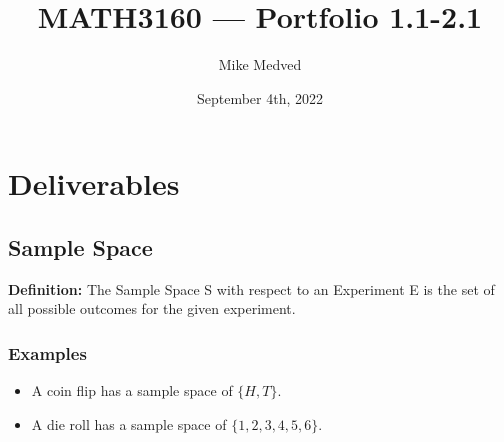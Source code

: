 \documentclass{article}
\title{MATH3160 — Portfolio 1.1-2.1}
\author{Mike Medved}
\date{September 4th, 2022}
\begin{document}
\maketitle

\section{Deliverables}

\subsection{Sample Space}

\textbf{Definition:} The Sample Space S with respect to an Experiment E is the set of all possible outcomes for the given experiment.

\subsubsection{Examples}

\begin{itemize}
    \item A coin flip has a sample space of $\{H, T\}$.
    \item A die roll has a sample space of $\{1, 2, 3, 4, 5, 6\}$.
\end{itemize}

\end{document}
